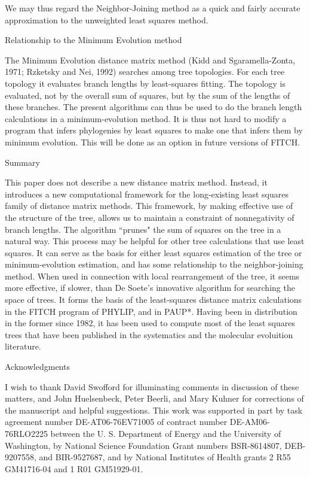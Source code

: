 \documentclass[12pt]{article}
\begin{document}
We may thus regard the Neighbor-Joining method as a quick and fairly
accurate approximation to the unweighted least squares method.
\bigskip

\centerline{\sc Relationship to the Minimum Evolution method}
\bigskip

The Minimum Evolution distance matrix method (Kidd and Sgaramella-Zonta, 1971;
Rzketsky and Nei, 1992) searches among tree topologies.  For each tree
topology it evaluates branch lengths by least-squares fitting.  The topology
is evaluated, not by the overall sum of squares, but by the sum of the lengths
of these branches.  The present algorithms can thus be used to do the branch
length calculations in a minimum-evolution method.  It is thus not hard to
modify a program that infers phylogenies by least squares to make one that
infers them by minimum evolution.  This will be done as an option
in future versions of FITCH.
\bigskip

\centerline{\sc Summary}
\bigskip

This paper does not describe a new distance matrix method.  Instead, it
introduces a new computational framework for the long-existing least
squares family of distance matrix methods.  This framework, by making effective
use of the structure of the tree, allows us to maintain a constraint of
nonnegativity of branch lengths.  The algorithm ``prunes" the sum of squares
on the tree in a natural way.  This process may be helpful for other
tree calculations that use least squares.  It can serve as the basis for either
least squares estimation of the tree or minimum-evolution estimation, and has
some relationship to the neighbor-joining method.  When used in
connection with local rearrangement of the tree, it seems more
effective, if slower, than De Soete's innovative algorithm for searching
the space of trees.  It forms the basis of the least-squares distance matrix
calculations in the FITCH program of PHYLIP, and in PAUP*.  Having been in
distribution in the former since 1982, it has been used to compute most of
the least squares trees that have been published in the systematics and
the molecular evoluition literature.
\bigskip

\centerline{\sc Acknowledgments}
\bigskip

I wish to thank David Swofford for illuminating comments in discussion of these
matters, and John Huelsenbeck, Peter Beerli, and Mary Kuhner for corrections
of the manuscript and helpful suggestions.
This work was supported in part by task agreement number DE-AT06-76EV71005
of contract number DE-AM06-76RLO2225 between the U. S. Department of Energy
and the University of Washington, by National Science Foundation
Grant numbers BSR-8614807, DEB-9207558, and BIR-9527687, and by National Institutes of Health
grants 2 R55 GM41716-04 and 1 R01 GM51929-01.
\end{document}

